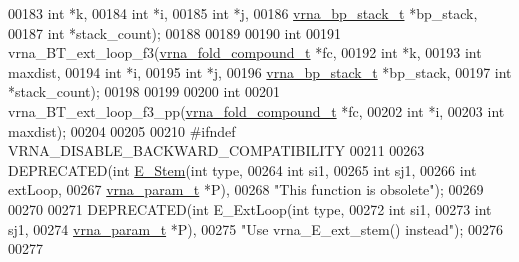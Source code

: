 \begin{DoxyCode}
00183                     \textcolor{keywordtype}{int}                   *k,
00184                     \textcolor{keywordtype}{int}                   *i,
00185                     \textcolor{keywordtype}{int}                   *j,
00186                     \hyperlink{group__data__structures_structvrna__bp__stack__s}{vrna\_bp\_stack\_t}       *bp\_stack,
00187                     \textcolor{keywordtype}{int}                   *stack\_count);
00188 
00189 
00190 \textcolor{keywordtype}{int}
00191 vrna\_BT\_ext\_loop\_f3(\hyperlink{group__fold__compound_structvrna__fc__s}{vrna\_fold\_compound\_t}  *fc,
00192                     \textcolor{keywordtype}{int}                   *k,
00193                     \textcolor{keywordtype}{int}                   maxdist,
00194                     \textcolor{keywordtype}{int}                   *i,
00195                     \textcolor{keywordtype}{int}                   *j,
00196                     \hyperlink{group__data__structures_structvrna__bp__stack__s}{vrna\_bp\_stack\_t}       *bp\_stack,
00197                     \textcolor{keywordtype}{int}                   *stack\_count);
00198 
00199 
00200 \textcolor{keywordtype}{int}
00201 vrna\_BT\_ext\_loop\_f3\_pp(\hyperlink{group__fold__compound_structvrna__fc__s}{vrna\_fold\_compound\_t} *fc,
00202                        \textcolor{keywordtype}{int}                  *i,
00203                        \textcolor{keywordtype}{int}                  maxdist);
00204 
00205 
00210 \textcolor{preprocessor}{#ifndef VRNA\_DISABLE\_BACKWARD\_COMPATIBILITY}
00211 
00263 DEPRECATED(\textcolor{keywordtype}{int} \hyperlink{group__eval__deprecated_ga51f9851f3500c2aae66674142a6a2dd5}{E\_Stem}(\textcolor{keywordtype}{int}           type,
00264                       \textcolor{keywordtype}{int}           si1,
00265                       \textcolor{keywordtype}{int}           sj1,
00266                       \textcolor{keywordtype}{int}           extLoop,
00267                       \hyperlink{group__energy__parameters_structvrna__param__s}{vrna\_param\_t}  *P),
00268            \textcolor{stringliteral}{"This function is obsolete"});
00269 
00270 
00271 DEPRECATED(\textcolor{keywordtype}{int} E\_ExtLoop(\textcolor{keywordtype}{int}          type,
00272                          \textcolor{keywordtype}{int}          si1,
00273                          \textcolor{keywordtype}{int}          sj1,
00274                          \hyperlink{group__energy__parameters_structvrna__param__s}{vrna\_param\_t} *P),
00275            \textcolor{stringliteral}{"Use vrna\_E\_ext\_stem() instead"});
00276 
00277 

\end{DoxyCode}
